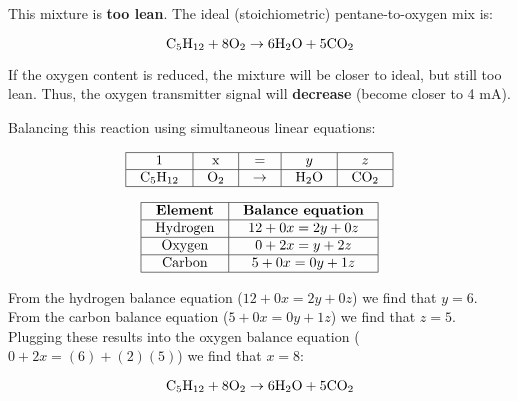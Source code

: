 





This mixture is {\bf too lean}.  The ideal (stoichiometric) pentane-to-oxygen mix is:

$$\hbox{C}_5\hbox{H}_{12} + \hbox{8O}_2 \to \hbox{6H}_2\hbox{O} + \hbox{5CO}_2$$

If the oxygen content is reduced, the mixture will be closer to ideal, but still too lean.  Thus, the oxygen transmitter signal will {\bf decrease} (become closer to 4 mA).
 






Balancing this reaction using simultaneous linear equations:


$$\vbox{\offinterlineskip
\halign{\strut
\vrule \quad\hfil # \ \hfil & 
\vrule \quad\hfil # \ \hfil & 
\vrule \quad\hfil # \ \hfil & 
\vrule \quad\hfil # \ \hfil & 
\vrule \quad\hfil # \ \hfil \vrule \cr
\noalign{\hrule}
%
1 & x & = & $y$ & $z$ \cr
%
\noalign{\hrule}
%
C$_{5}$H$_{12}$ & O$_{2}$ & $\to$ & H$_{2}$O & CO$_{2}$ \cr
%
\noalign{\hrule}
} %
}$$ %


$$\vbox{\offinterlineskip
\halign{\strut
\vrule \quad\hfil # \ \hfil & 
\vrule \quad\hfil # \ \hfil \vrule \cr
\noalign{\hrule}
%
{\bf Element} & {\bf Balance equation} \cr
%
\noalign{\hrule}
%
Hydrogen & $12 + 0x = 2y + 0z$ \cr
%
\noalign{\hrule}
%
Oxygen & $0 + 2x = y + 2z$ \cr
%
\noalign{\hrule}
%
Carbon & $5 + 0x = 0y + 1z$ \cr
%
\noalign{\hrule}
} %
}$$ %

From the hydrogen balance equation ($12 + 0x = 2y + 0z$) we find that $y = 6$.  From the carbon balance equation ($5 + 0x = 0y + 1z$) we find that $z = 5$.  Plugging these results into the oxygen balance equation ($0 + 2x = (6) + (2)(5)$) we find that $x = 8$:

$$\hbox{C}_5\hbox{H}_{12} + \hbox{8O}_2 \to \hbox{6H}_2\hbox{O} + \hbox{5CO}_2$$




